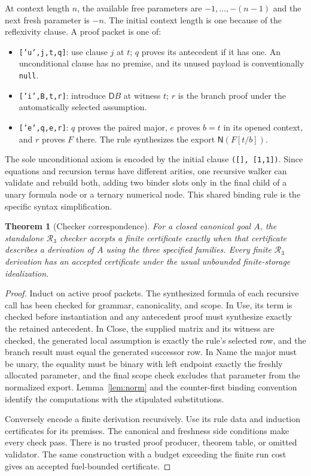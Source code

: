 \documentclass[11pt,letterpaper]{article}
\newtheorem{theorem}{Theorem}[section]
\theoremstyle{definition}\newtheorem{definition}[theorem]{Definition}
\theoremstyle{remark}\newtheorem{remark}[theorem]{Remark}
\newcommand{\RN}{\mathcal R_3}
\newcommand{\NF}{\mathsf N}
\newcommand{\DD}{\mathsf D}
\begin{document}
At context length $n$, the available free parameters are
$-1,\ldots,-(n-1)$ and the next fresh parameter is $-n$.
The initial context length is one because of the reflexivity
clause. A proof packet is one of:
\begin{itemize}
\item \texttt{['u',j,t,q]}: use clause $j$ at $t$; $q$ proves
its antecedent if it has one. An unconditional clause has no
premise, and its unused payload is conventionally \texttt{null}.
\item \texttt{['i',B,t,r]}: introduce $\DD B$ at witness $t$;
$r$ is the branch proof under the automatically selected assumption.
\item \texttt{['e',q,e,r]}: $q$ proves the paired major,
$e$ proves $b=t$ in its opened context, and $r$ proves $F$ there.
The rule synthesizes the export $\NF(F[t/b])$.
\end{itemize}

The sole unconditional axiom is encoded by the initial clause
\texttt{([], [1,1])}. Since equations and recursion terms have
different arities, one recursive walker can validate and rebuild
both, adding two binder slots only in the final child of a unary
formula node or a ternary numerical node. This shared binding
rule is the specific syntax simplification.

\begin{theorem}[Checker correspondence]\label{thm:checker}
For a closed canonical goal $A$, the standalone $\RN$ checker
accepts a finite certificate exactly when that certificate
describes a derivation of $A$ using the three specified families.
Every finite $\RN$ derivation has an accepted certificate under
the usual unbounded finite-storage idealization.
\end{theorem}
\begin{proof}
Induct on active proof packets. The synthesized formula of each
recursive call has been checked for grammar, canonicality, and
scope. In Use, its term is checked before instantiation and any
antecedent proof must synthesize exactly the retained antecedent.
In Close, the supplied matrix and its witness are checked,
the generated local assumption is exactly the rule's selected
row, and the branch result must equal the generated successor
row. In Name the major must be unary, the equality must be
binary with left endpoint exactly the freshly allocated
parameter, and the final scope check excludes that parameter
from the normalized export. Lemma~\ref{lem:norm} and the
counter-first binding convention identify the computations with
the stipulated substitutions.

Conversely encode a finite derivation recursively. Use its rule
data and induction certificates for its premises. The canonical
and freshness side conditions make every check pass. There is
no trusted proof producer, theorem table, or omitted validator.
The same construction with a budget exceeding the finite run
cost gives an accepted fuel-bounded certificate.
\end{proof}
\end{document}
